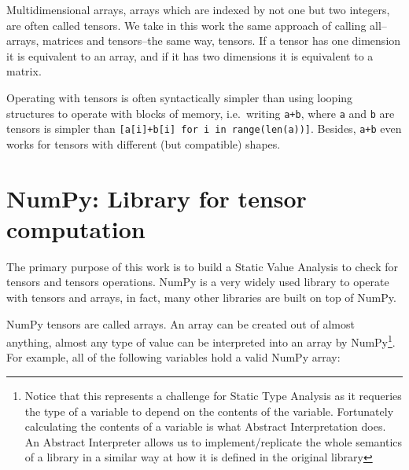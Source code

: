 Multidimensional arrays, arrays which are indexed by not one but two
integers, are often called tensors. We take in this work the same
approach of calling all--arrays, matrices and tensors--the same way,
tensors. If a tensor has one dimension it is equivalent to an array, and
if it has two dimensions it is equivalent to a matrix.

Operating with tensors is often syntactically simpler than using looping
structures to operate with blocks of memory, i.e.~writing \texttt{a+b},
where \texttt{a} and \texttt{b} are tensors is simpler than
\texttt{{[}a{[}i{]}+b{[}i{]}\ for\ i\ in\ range(len(a)){]}}. Besides,
\texttt{a+b} even works for tensors with different (but compatible)
shapes.

\section{NumPy: Library for tensor computation}
\label{numpy-library-for-tensor-computation}

The primary purpose of this work is to build a Static Value Analysis to
check for tensors and tensors operations. NumPy
\autocite{oliphant2006guide} is a very widely used library to operate
with tensors and arrays, in fact, many other libraries are built on top
of NumPy.

NumPy tensors are called arrays. An array can be created out of almost
anything, almost any type of value can be interpreted into an array by
NumPy\footnote{Notice that this represents a challenge for Static Type
  Analysis as it requeries the type of a variable to depend on the
  contents of the variable. Fortunately calculating the contents of a
  variable is what Abstract Interpretation does. An Abstract Interpreter
  allows us to implement/replicate the whole semantics of a library in a
  similar way at how it is defined in the original library}. For
example, all of the following variables hold a valid NumPy array:

\begin{Shaded}
\begin{Highlighting}[]
\OperatorTok{=}\NormalTok{)       }
\OperatorTok{=}\NormalTok{ np.array([[}\NormalTok{, }\NormalTok{], [}\NormalTok{, }\NormalTok{]])  }
\OperatorTok{=}\NormalTok{ np.array([[}\NormalTok{, }\NormalTok{], [}\NormalTok{]])     }
\OperatorTok{=}\NormalTok{ np.array([(}\NormalTok{, }\NormalTok{), [}\NormalTok{, }\NormalTok{]])  }
\OperatorTok{=}\NormalTok{ np.array([[}\NormalTok{, }\NormalTok{], \{}\NormalTok{, }\NormalTok{\}])     }
\end{Highlighting}
\end{Shaded}


